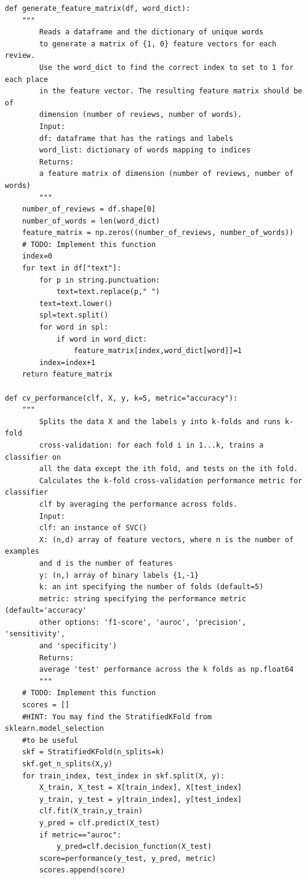 \documentclass{article}
\begin{document}
\begin{lstlisting}
def generate_feature_matrix(df, word_dict):
    """
        Reads a dataframe and the dictionary of unique words
        to generate a matrix of {1, 0} feature vectors for each review.
        Use the word_dict to find the correct index to set to 1 for each place
        in the feature vector. The resulting feature matrix should be of
        dimension (number of reviews, number of words).
        Input:
        df: dataframe that has the ratings and labels
        word_list: dictionary of words mapping to indices
        Returns:
        a feature matrix of dimension (number of reviews, number of words)
        """
    number_of_reviews = df.shape[0]
    number_of_words = len(word_dict)
    feature_matrix = np.zeros((number_of_reviews, number_of_words))
    # TODO: Implement this function
    index=0
    for text in df["text"]:
        for p in string.punctuation:
            text=text.replace(p," ")
        text=text.lower()
        spl=text.split()
        for word in spl:
            if word in word_dict:
                feature_matrix[index,word_dict[word]]=1
        index=index+1
    return feature_matrix

def cv_performance(clf, X, y, k=5, metric="accuracy"):
    """
        Splits the data X and the labels y into k-folds and runs k-fold
        cross-validation: for each fold i in 1...k, trains a classifier on
        all the data except the ith fold, and tests on the ith fold.
        Calculates the k-fold cross-validation performance metric for classifier
        clf by averaging the performance across folds.
        Input:
        clf: an instance of SVC()
        X: (n,d) array of feature vectors, where n is the number of examples
        and d is the number of features
        y: (n,) array of binary labels {1,-1}
        k: an int specifying the number of folds (default=5)
        metric: string specifying the performance metric (default='accuracy'
        other options: 'f1-score', 'auroc', 'precision', 'sensitivity',
        and 'specificity')
        Returns:
        average 'test' performance across the k folds as np.float64
        """
    # TODO: Implement this function
    scores = []
    #HINT: You may find the StratifiedKFold from sklearn.model_selection
    #to be useful
    skf = StratifiedKFold(n_splits=k)
    skf.get_n_splits(X,y)
    for train_index, test_index in skf.split(X, y):
        X_train, X_test = X[train_index], X[test_index]
        y_train, y_test = y[train_index], y[test_index]
        clf.fit(X_train,y_train)
        y_pred = clf.predict(X_test)
        if metric=="auroc":
            y_pred=clf.decision_function(X_test)
        score=performance(y_test, y_pred, metric)
        scores.append(score)


\end{lstlisting}
\end{document}
